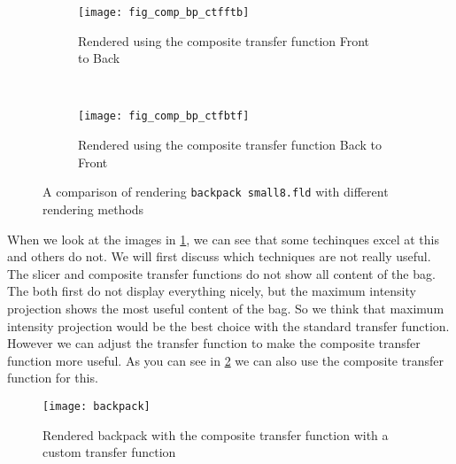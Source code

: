 \begin{figure}[H]
	\ContinuedFloat
	\centering
	\begin{subfigure}[t]{0.45\textwidth}
		\texttt{[image: fig\_comp\_bp\_ctfftb]}
		\caption{Rendered using the composite transfer function Front to Back}
	\end{subfigure}
	~%
	\begin{subfigure}[t]{0.45\textwidth}
		\texttt{[image: fig\_comp\_bp\_ctfbtf]}
		\caption{Rendered using the composite transfer function Back to Front}
	\end{subfigure}
	
	\caption{A comparison of rendering \texttt{backpack small8.fld} with different rendering methods}
	\label{fig:comp:bp}
\end{figure}
When we look at the images in \ref{fig:comp:bp}, we can see that some techinques excel at this and others do not. 
We will first discuss which techniques are not really useful. 
The slicer and composite transfer functions do not show all content of the bag.
The both first do not display everything nicely, but the maximum intensity projection shows the  most useful content of the bag. 
So we think that maximum intensity projection would be the best choice with the standard transfer function.
However we can adjust the transfer function to make the composite transfer function more useful.
As you can see in \ref{fig:comp:backpak} we can also use the composite transfer function for this.
\begin{figure}[H]
	\centering
		\texttt{[image: backpack]}
		\caption{Rendered backpack with the composite transfer function with a custom transfer function}
	\label{fig:comp:backpak}
\end{figure}

